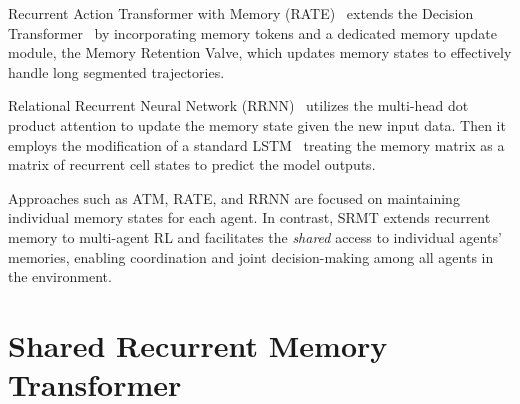\documentclass{article} %
\begin{document}
Recurrent Action Transformer with Memory (RATE)~\citep{cherepanov2024recurrentactiontransformermemory} extends the Decision Transformer~\citep{2021decisiontransformer} by incorporating memory tokens and a dedicated memory update module, the Memory Retention Valve, which updates memory states to effectively handle long segmented trajectories.

Relational Recurrent Neural Network (RRNN)~\citep{rrnn} utilizes the multi-head dot product attention to update the memory state given the new input data. Then it employs the modification of a standard LSTM~\citep{hochreiter1997long} treating the memory matrix as a matrix of recurrent cell states to predict the model outputs.

Approaches such as ATM, RATE, and RRNN are focused on maintaining individual memory states for each agent. In contrast, SRMT extends recurrent memory to multi-agent RL and facilitates the \textit{shared} access to individual agents' memories, enabling coordination and joint decision-making among all agents in the environment.


% 










\section{Shared Recurrent Memory Transformer}
\label{sec:srmt}
\end{document}
